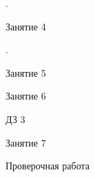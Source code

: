 \begin{class}[number=1]
	\begin{listofex}
		\item .
\end{listofex}
\end{class}

\begin{class}[number=4]
	\begin{listofex}
		\item Занятие 4
	\end{listofex}
\end{class}

\begin{homework}[number=1]
	\begin{listofex}
		\item .
	\end{listofex}
\end{homework}

\begin{class}[number=5]
	\begin{listofex}
		\item Занятие 5
	\end{listofex}
\end{class}

\begin{class}[number=6]
	\begin{listofex}
		\item Занятие 6
	\end{listofex}
\end{class}

\begin{homework}[number=3]
	\begin{listofex}
		\item ДЗ 3
	\end{listofex}
\end{homework}

\begin{class}[number=7]
	\begin{listofex}
		\item Занятие 7
	\end{listofex}
\end{class}

\begin{exam}
	\begin{listofex}
		\item Проверочная работа
	\end{listofex}
\end{exam}

